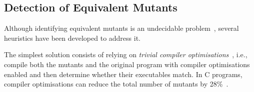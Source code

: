 %
%
%




\subsection{Detection of Equivalent Mutants}
\label{sec:background:equivalent}

Although identifying equivalent mutants is an undecidable problem~\cite{madeyski2013overcoming,Bugg:Correctness:82}, several heuristics have been developed to address it. 

The simplest solution consists of relying on \emph{trivial compiler optimisations}~\cite{papadakis2015trivial, kintis2017detecting,papadakis2019mutation}, i.e., compile both the mutants and the original program with compiler optimisations enabled and then determine whether their executables match. In C programs, compiler optimisations can reduce the total number of mutants by 28\%~\cite{kintis2017detecting}.



